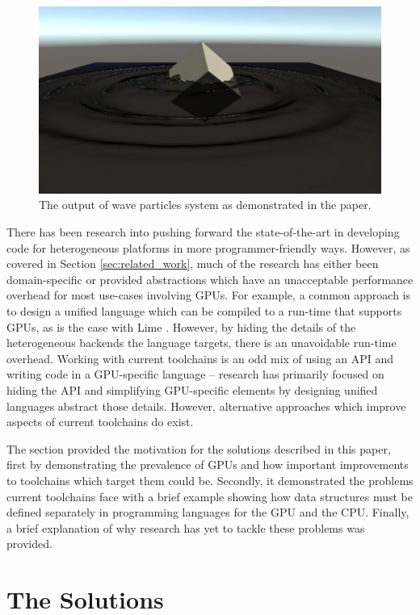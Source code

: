 \documentclass[a4paper,12pt,twoside,openright]{report}
\begin{document}
\begin{figure}[h]
\centering
\includegraphics[width=0.8\linewidth]{waveparticles_example}
\caption{The output of wave particles system as demonstrated in the paper.}
\label{fig:waveparticles_example}
\end{figure}

There has been research into pushing forward the state-of-the-art in developing
code for heterogeneous platforms in more programmer-friendly ways. However, as
covered in Section \ref{sec:related_work}, much of the research has either been
domain-specific or provided abstractions which have an unacceptable performance
overhead for most use-cases involving GPUs. For example, a common approach is
to design a unified language which can be compiled to a run-time that supports
GPUs, as is the case with Lime \cite{Lime2010}. However, by hiding the details
of the heterogeneous backends the language targets, there is an unavoidable
run-time overhead. Working with current toolchains is an odd mix of using an
API and writing code in a GPU-specific language -- research has primarily
focused on hiding the API and simplifying GPU-specific elements by designing
unified languages abstract those details. However, alternative approaches which
improve aspects of current toolchains do exist.

The section provided the motivation for the solutions described in this paper,
first by demonstrating the prevalence of GPUs and how important improvements to
toolchains which target them could be. Secondly, it demonstrated the problems
current toolchains face with a brief example showing how data structures must be
defined separately in programming languages for the GPU and the CPU. Finally, a
brief explanation of why research has yet to tackle these problems was
provided.

\section{The Solutions}
\end{document}
